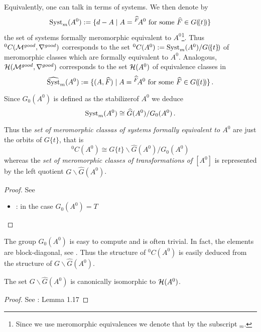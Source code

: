 Equivalently, one can talk in terms of systems. We then denote by
\[
  \operatorname{Syst}_m(A^0):=\{d-A
    \mid A={}^{\widehat F}\!A^0 \text{ for some } \widehat F\in G(\!(t)\!)\}
\]
the set of systems formally meromorphic equivalent to $A^0$\footnote{Since we
use meromorphic equivalences we denote that by the subscript ${}_m$.}.
Thus ${}^0C(\mathcal{M}^{good},\nabla^{good})$ corresponds to
the set ${}^0C(A^0):=\operatorname{Syst}_m(A^0)/G(\!\{t\}\!)$ of meromorphic classes which
are formally equivalent to $A^0$.
Analogous, $\mathcal{H}(\mathcal{M}^{good},\nabla^{good})$ corresponds to the set $\mathcal{H}(A^0)$ of
equivalence classes in
\[
  \widehat{\operatorname{Syst}}_m(A^0):=\{(A,\widehat F)
    \mid A={}^{\widehat F}\!A^0 \text{ for some } \widehat F\in G(\!(t)\!)\} \,.
\]

\begin{lem}
  Since $G_0(A^0)$ is defined as the stabilizer\TODO[correct?] of $A^0$ we deduce
  \[
    \operatorname{Syst}_m(A^0)\cong \widehat G(A^0)/G_0(A^0) \,.
  \]
  \begin{cor}
    Thus the \emph{set of meromorphic classas of systems formally equivalent
      to $A^0$} are just the orbits of $G\{t\}$, that is
    \[
      {}^0C(A^0)\cong G\{t\}\backslash\hat G(A^0)/G_0(A^0)
    \]
    whereas the \emph{set of meromorphic classes of transformations of $[A^0]$}
    is represented by the left quotient $G\backslash\hat G(A^0)$.
  \end{cor}
\end{lem}
\begin{proof}
  See
  \begin{itemize}
    \item \cite[6]{thboalch}: in the case $G_0(A^0)=T$
  \end{itemize}
\end{proof}

The group $G_0(A^0)$ is easy to compute and is often trivial. In fact, the
elements are block-diagonal, see \cite[77]{Loday2014}.
Thus the structure of ${}^0C(A^0)$ is easily deduced from the structure of
$G\backslash\hat G(A^0)$.

\begin{lem}
  The set $G\backslash\hat G(A^0)$ is canonically isomorphic to $\mathcal{H}(A^0)$.
\end{lem}
\begin{proof}
  See \cite{thboalch}: Lemma 1.17
\end{proof}

